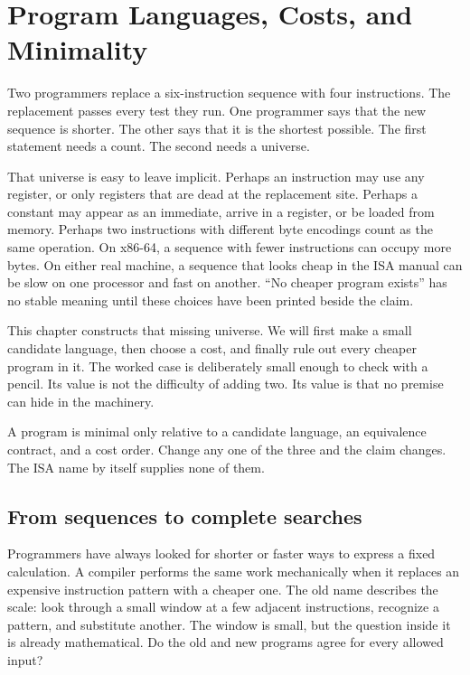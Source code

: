 \chapter{Program Languages, Costs, and Minimality}
\label{ch:languages-costs}

Two programmers replace a six-instruction sequence with four instructions.
The replacement passes every test they run. One programmer says that the new
sequence is shorter. The other says that it is the shortest possible. The
first statement needs a count. The second needs a universe.

That universe is easy to leave implicit. Perhaps an instruction may use any
register, or only registers that are dead at the replacement site. Perhaps a
constant may appear as an immediate, arrive in a register, or be loaded from
memory. Perhaps two instructions with different byte encodings count as the
same operation. On x86-64, a sequence with fewer instructions can occupy more
bytes. On either real machine, a sequence that looks cheap in the ISA manual
can be slow on one processor and fast on another. ``No cheaper program
exists'' has no stable meaning until these choices have been printed beside
the claim.

This chapter constructs that missing universe. We will first make a small
candidate language, then choose a cost, and finally rule out every cheaper
program in it. The worked case is deliberately small enough to check with a
pencil. Its value is not the difficulty of adding two. Its value is that no
premise can hide in the machinery.

\begin{keyidea}[title={A minimality claim has three named parts}]
A program is minimal only relative to a candidate language, an equivalence
contract, and a cost order. Change any one of the three and the claim changes.
The ISA name by itself supplies none of them.
\end{keyidea}

\section{From sequences to complete searches}

Programmers have always looked for shorter or faster ways to express a fixed
calculation. A compiler performs the same work mechanically when it replaces
an expensive instruction pattern with a cheaper one. The old name
 describes the scale: look through a small window
at a few adjacent instructions, recognize a pattern, and substitute another.
The window is small, but the question inside it is already mathematical. Do
the old and new programs agree for every allowed input?

